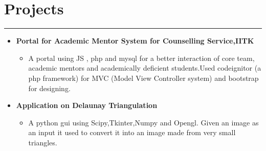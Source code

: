 \documentclass[a4paper]{article}
\begin{document}
 
\section*{Projects}
\hrule
\vspace{3mm}
  \begin{itemize}
   \item 
   \textbf{Portal for Academic Mentor System for Counselling Service,IITK}
	   \begin{itemize}
	    \item A portal using JS , php and mysql for a better interaction of core team, academic mentors and academically 
		  deficient students.Used codeignitor (a php framework) for MVC (Model View Controller system) 
		  and bootstrap for designing.
	   \end{itemize}
    \item
      \textbf{Application on Delaunay  Triangulation}
	\begin{itemize}
	 \item A python gui using Scipy,Tkinter,Numpy and Opengl. 
	      Given an image as an input it used to convert it into an image made from very small triangles.
	\end{itemize}
 

 
  \end{itemize}
\end{document}
